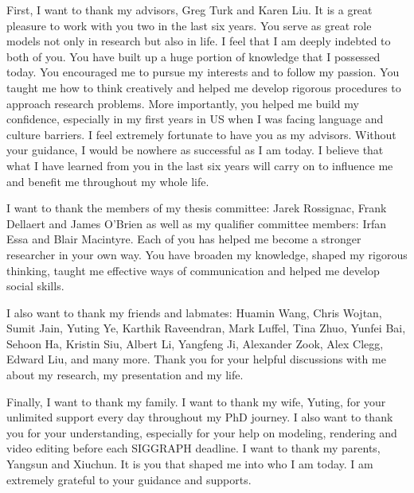 First, I want to thank my advisors, Greg Turk and Karen Liu. It is a great pleasure to work with you two in the last six years. You serve as great role models not only in research but also in life. I feel that I am deeply indebted to both of you. You have built up a huge portion of knowledge that I possessed today. You encouraged me to pursue my interests and to follow my passion. You taught me how to think creatively and helped me develop rigorous procedures to approach research problems. More importantly, you helped me build my confidence, especially in my first years in US when I was facing language and culture barriers. I feel extremely fortunate to have you as my advisors. Without your guidance, I would be nowhere as successful as I am today. I believe that what I have learned from you in the last six years will carry on to influence me and benefit me throughout my whole life.

I want to thank the members of my thesis committee: Jarek Rossignac, Frank Dellaert and James O'Brien as well as my qualifier committee members: Irfan Essa and Blair Macintyre. Each of you has helped me become a stronger researcher in your own way. You have broaden my knowledge, shaped my rigorous thinking, taught me effective ways of communication and helped me develop social skills.

I also want to thank my friends and labmates: Huamin Wang, Chris Wojtan, Sumit Jain, Yuting Ye, Karthik Raveendran, Mark Luffel, Tina Zhuo, Yunfei Bai, Sehoon Ha, Kristin Siu, Albert Li, Yangfeng Ji, Alexander Zook, Alex Clegg, Edward Liu, and many more. Thank you for your helpful discussions with me about my research, my presentation and my life.

Finally, I want to thank my family. I want to thank my wife, Yuting, for your unlimited support every day throughout my PhD journey. I also want to thank you for your understanding, especially for your help on modeling, rendering and video editing before each SIGGRAPH deadline. I want to thank my parents, Yangsun and Xiuchun. It is you that shaped me into who I am today. I am extremely grateful to your guidance and supports.
